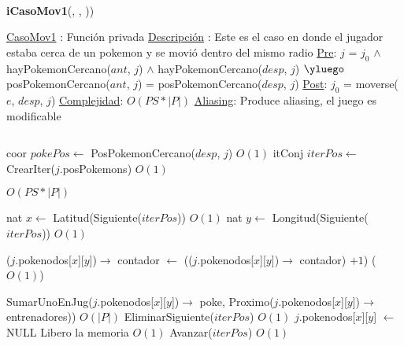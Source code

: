 \begin{Algoritmos}
\begin{algorithmic}[1]
\end{algorithmic}



$ $\newline
$ $\newline


{\textbf{iCasoMov1}(,  , ))}
\begin{algorithmic}[1]

\Statex \underline{CasoMov1} : Funci\'on privada 
\Statex \underline{Descripci\'on} : Este es el caso en donde el jugador estaba cerca de un pokemon y se movi\'o dentro del mismo radio 
\Statex \underline{Pre}: $j$ = $j_0$ $\land$ hayPokemonCercano($ant$, $j$) $\land$ hayPokemonCercano($desp$, $j$) $\yluego$ posPokemonCercano($ant$, $j$) = posPokemonCercano($desp$, $j$) 
\Statex \underline{Post}: $j_0$ = moverse($e$, $desp$, $j$) 
\Statex \underline{Complejidad}: $O(PS *|P|)$ 
\Statex \underline{Aliasing}: Produce aliasing, el juego es modificable

$ $\newline

\State coor $pokePos \gets$ PosPokemonCercano($desp$, $j$) \Comment $O(1)$
\State itConj $iterPos \gets$ CrearIter($j$.posPokemons) \Comment $O(1)$ 

  \Comment $O(PS * |P|)$

  \State nat $x \gets$ Latitud(Siguiente($iterPos$)) \Comment $O(1)$
  \State nat $y \gets$ Longitud(Siguiente($iterPos$)) \Comment $O(1)$   
  
    \State ($j$.pokenodos[$x$][$y$])$\rightarrow$ contador $\gets$ (($j$.pokenodos[$x$][$y$])$\rightarrow$ contador) $+ 1$) \Comment($O(1)$)
  \EndIf
  
    \State SumarUnoEnJug($j$.pokenodos[$x$][$y$])$\rightarrow$ poke, Proximo($j$.pokenodos[$x$][$y$])$\rightarrow$ entrenadores)) \Comment $O(|P|)$
    \State EliminarSiguiente($iterPos$) \Comment $O(1)$
    \State $j$.pokenodos[$x$][$y$] $\gets$ NULL \Comment Libero la memoria $O(1)$
  \Else 
    \State Avanzar($iterPos$) \Comment $O(1)$ 
  \EndIf

\EndWhile 


\end{algorithmic}
\end{Algoritmos}
